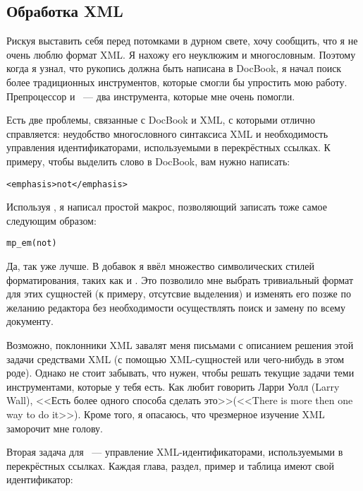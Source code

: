 \subsection{Обработка XML}

Рискуя выставить себя перед потомками в дурном свете, хочу сообщить,
что я не очень люблю формат XML. Я нахожу его неуклюжим и
многословным. Поэтому когда я узнал, что рукопись должна быть написана
в DocBook, я начал поиск более традиционных инструментов, которые
смогли бы упростить мою работу. Препроцессор  и
~--- два инструмента, которые мне очень помогли.

Есть две проблемы, связанные с DocBook и XML, с которыми 
отлично справляется: неудобство многословного синтаксиса XML и
необходимость управления идентификаторами, используемыми в
перекрёстных ссылках. К примеру, чтобы выделить слово в DocBook, вам
нужно написать:

\begin{verbatim}
<emphasis>not</emphasis>
\end{verbatim}

Используя , я написал простой макрос, позволяющий записать
тоже самое следующим образом:

\begin{verbatim}
mp_em(not)
\end{verbatim}

Да, так уже лучше. В добавок я ввёл множество символических стилей
форматирования, таких как  и
. Это позволило мне выбрать тривиальный формат для
этих сущностей (к примеру, отсутсвие выделения) и изменять его позже
по желанию редактора без необходимости осуществлять поиск и замену по
всему документу.

Возможно, поклонники XML завалят меня письмами с описанием решения
этой задачи средствами XML (с помощью XML-сущностей или чего-нибудь в
этом роде). Однако не стоит забывать, что \UNIX{} нужен, чтобы решать
текущие задачи теми инструментами, которые у тебя есть. Как любит
говорить Ларри Уолл (Larry Wall), <<Есть более одного способа сделать
это>>(<<There is more then one way to do it>>). Кроме того, я
опасаюсь, что чрезмерное изучение XML заморочит мне голову.

Вторая задача для ~--- управление XML-идентификаторами,
используемыми в перекрёстных ссылках. Каждая глава, раздел, пример и
таблица имеют свой идентификатор:

